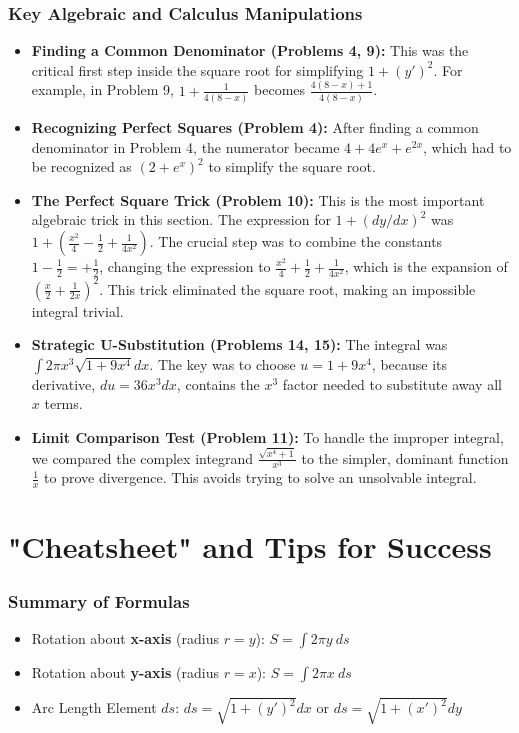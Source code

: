 \documentclass{article}
\begin{document}
\section{Key Algebraic and Calculus Manipulations}
\begin{itemize}
    \item \textbf{Finding a Common Denominator (Problems 4, 9):} This was the critical first step inside the square root for simplifying \(1+(y')^2\). For example, in Problem 9, \(1 + \frac{1}{4(8-x)}\) becomes \(\frac{4(8-x)+1}{4(8-x)}\).
    \item \textbf{Recognizing Perfect Squares (Problem 4):} After finding a common denominator in Problem 4, the numerator became \(4+4e^x+e^{2x}\), which had to be recognized as \((2+e^x)^2\) to simplify the square root.
    \item \textbf{The Perfect Square Trick (Problem 10):} This is the most important algebraic trick in this section. The expression for \(1+(dy/dx)^2\) was \(1 + (\frac{x^2}{4} - \frac{1}{2} + \frac{1}{4x^2})\). The crucial step was to combine the constants \(1 - \frac{1}{2} = +\frac{1}{2}\), changing the expression to \(\frac{x^2}{4} + \frac{1}{2} + \frac{1}{4x^2}\), which is the expansion of \((\frac{x}{2}+\frac{1}{2x})^2\). This trick eliminated the square root, making an impossible integral trivial.
    \item \textbf{Strategic U-Substitution (Problems 14, 15):} The integral was \(\int 2\pi x^3 \sqrt{1+9x^4} dx\). The key was to choose \(u=1+9x^4\), because its derivative, \(du=36x^3 dx\), contains the \(x^3\) factor needed to substitute away all \(x\) terms.
    \item \textbf{Limit Comparison Test (Problem 11):} To handle the improper integral, we compared the complex integrand \(\frac{\sqrt{x^4+1}}{x^3}\) to the simpler, dominant function \(\frac{1}{x}\) to prove divergence. This avoids trying to solve an unsolvable integral.
\end{itemize}

\part*{"Cheatsheet" and Tips for Success}

\section{Summary of Formulas}
\begin{itemize}
    \item Rotation about \textbf{x-axis} (radius \(r=y\)): \(S = \int 2\pi y \ ds\)
    \item Rotation about \textbf{y-axis} (radius \(r=x\)): \(S = \int 2\pi x \ ds\)
    \item Arc Length Element \(ds\): \(ds = \sqrt{1+(y')^2}dx\) or \(ds = \sqrt{1+(x')^2}dy\)
\end{itemize}
\end{document}
